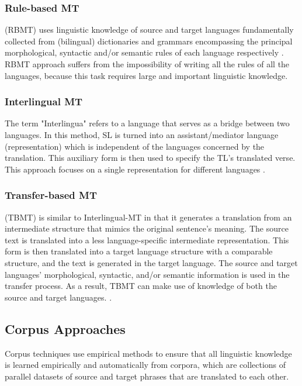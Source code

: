 \subsubsection{\textbf{Rule-based MT}}
(RBMT) uses linguistic knowledge of source and target languages fundamentally collected from (bilingual) dictionaries and grammars encompassing the principal morphological, syntactic and/or semantic rules of each language
respectively \cite{okpor14}. 
RBMT approach suffers from the impossibility of writing all the rules of all the languages, because this task requires large and important linguistic knowledge. %

\subsubsection{\textbf{Interlingual MT}}
The term "Interlingua" refers to a language that serves as a bridge between two languages. In this method, SL is turned into an assistant/mediator language (representation) which is independent of the languages concerned by the translation. This auxiliary form is then used to specify the TL's translated verse. This approach focuses on a single representation for different languages \cite{Ashraf15}.

\subsubsection{\textbf{Transfer-based MT}}
(TBMT) is similar to Interlingual-MT in that it generates a translation from an intermediate structure that mimics the original sentence's meaning. The source text is translated into a less language-specific intermediate representation. This form is then translated into a target language structure with a comparable structure, and the text is generated in the target language. The source and target languages' morphological, syntactic, and/or semantic information is used in the transfer process. As a result, TBMT can make use of knowledge of both the source and target languages. \cite{DO11}. 

\subsection{Corpus Approaches}
Corpus techniques use empirical methods to ensure that all linguistic knowledge is learned empirically and automatically from corpora, which are collections of parallel datasets of source and target phrases that are translated to each other.


